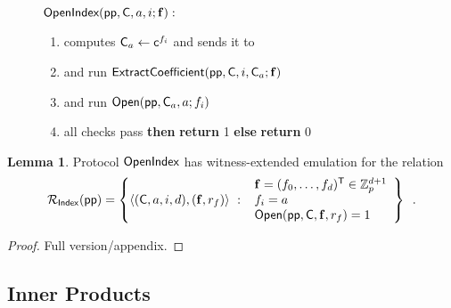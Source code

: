 \documentclass{article}
\theoremstyle{definition}
\newtheorem{lemma}{Lemma}
\begin{document}
\begin{figure}[!htp]
\noindent\begin{mdframed}[userdefinedwidth=\textwidth]
\begin{minipage}{\textwidth}
	\begin{flushleft}
	$\textsf{{OpenIndex}}(\textsf{pp}, \mathsf{C}, a, i; \mathbf{f}):$ 
		\begin{enumerate}[nolistsep]
		    \item \prover computes $\mathsf{C}_a \gets \mathsf{c}^{f_i}$ and sends it to \verifier
		    \item \prover and \verifier run $\textsf{{ExtractCoefficient}}(\textsf{pp}, \mathsf{C}, i, \mathsf{C}_a; \mathbf{f})$
		    \item \prover and \verifier run $\textsf{{Open}}(\textsf{pp}, \mathsf{C}_a, a; f_i)$
		    \item \pcif{}all checks pass \textbf{then} \textbf{return} 1 \textbf{else} \textbf{return} 0
		\end{enumerate}
	\end{flushleft}
\end{minipage}
\end{mdframed}
\end{figure}

\begin{lemma}
    Protocol $\textsf{{OpenIndex}}$ has witness-extended emulation for the relation
    \[
        \mathcal{R}_\mathsf{Index}(\params) = \left\{
            \langle(\gr{C}, a, i, d), (\mathbf{f}, r_f)\rangle \ : \ \begin{array}{l}
                \mathbf{f} = (f_0, \ldots, f_d)^\mathsf{T} \in \mathbb{Z}_p^{d+1} \\
                f_i = a \\
                \pro{Open}(\params, \gr{C}, \mathbf{f}, r_f) = 1
            \end{array}
        \right\} \enspace .
    \]
\end{lemma}

\begin{proof}
Full version/appendix.
\end{proof}

\subsection{Inner Products}
\end{document}
